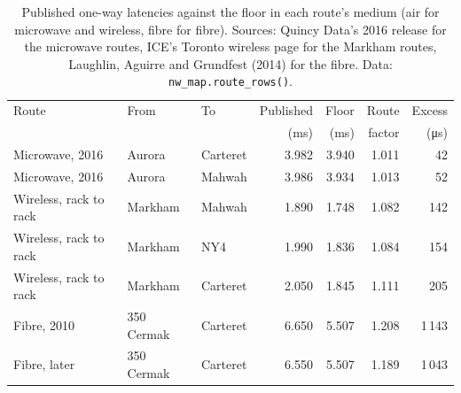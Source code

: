 \begin{table}[ht]
\centering\small
\begin{tabular}{lllrrrr}
\toprule
Route & From & To & Published & Floor & Route & Excess \\
 & & & (ms) & (ms) & factor & (\si{\micro\second}) \\
\midrule
Microwave, 2016 & Aurora & Carteret & 3.982 & 3.940 & 1.011 & 42 \\
Microwave, 2016 & Aurora & Mahwah & 3.986 & 3.934 & 1.013 & 52 \\
Wireless, rack to rack & Markham & Mahwah & 1.890 & 1.748 & 1.082 & 142 \\
Wireless, rack to rack & Markham & NY4 & 1.990 & 1.836 & 1.084 & 154 \\
Wireless, rack to rack & Markham & Carteret & 2.050 & 1.845 & 1.111 & 205 \\
Fibre, 2010 & 350 Cermak & Carteret & 6.650 & 5.507 & 1.208 & 1\,143 \\
Fibre, later & 350 Cermak & Carteret & 6.550 & 5.507 & 1.189 & 1\,043 \\
\bottomrule
\end{tabular}
\caption{Published one-way latencies against the floor in each route's medium (air for microwave and wireless, fibre for fibre). Sources:
Quincy Data's 2016 release for the microwave routes, ICE's Toronto wireless page for the Markham routes, Laughlin, Aguirre and Grundfest
(2014) for the fibre. Data: \texttt{nw\_map.route\_rows()}.}\label{tab:nw:the-north-american-map:routes}
\end{table}

\label{lst:nw:the-north-american-map:routes}

